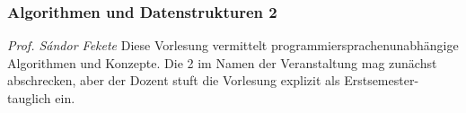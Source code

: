 
\subsubsection{Algorithmen und Datenstrukturen 2}
	\textit{Prof. S\'andor Fekete}
	Diese Vorlesung vermittelt programmiersprachenunabhängige Algorithmen und Konzepte. Die \glqq{}2\grqq{} im Namen der Veranstaltung mag zunächst abschrecken, aber der Dozent stuft die Vorlesung explizit als Erstsemester-tauglich ein. 